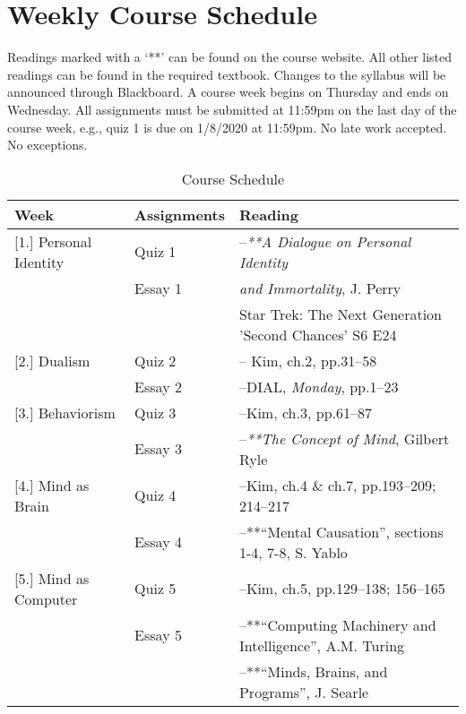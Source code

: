 \documentclass[article,oneside]{memoir}
\begin{document}
\section{Weekly Course Schedule}
Readings marked with a `**' can be found on the course website. All other listed readings can be found in the required textbook. Changes to the syllabus will be announced through Blackboard. A course week begins on Thursday and ends on Wednesday.   All assignments must be submitted at 11:59pm on the last day of the course week, e.g., quiz 1 is due on 1/8/2020 at 11:59pm. No late work accepted. No exceptions.   \newline


\begin{center}
\begin{longtable}{p{4.5cm}p{2cm}p{6cm}}
 
  \caption{Course Schedule} \\
  \toprule
  \textbf{Week} &\textbf{Assignments} & \textbf{Reading} \\
  \midrule

[1.] Personal Identity			& Quiz 1		& --\emph{**A Dialogue on Personal Identity } \\
				        		& Essay 1		& \emph{and Immortality}, J. Perry  \\ 
						&			& Star Trek: The Next Generation 'Second Chances' S6 E24 \\ [1.8\baselineskip]
	
[2.] Dualism			      	& Quiz 2		& -- Kim, ch.2, pp.31--58\\
					        	& Essay 2		& --DIAL, \emph{Monday}, pp.1--23  \\ [1.8\baselineskip]


[3.] Behaviorism		    	& Quiz 3	   	& --Kim, ch.3, pp.61--87 \\
			        			& Essay 3		&  --\emph{**The Concept of Mind}, Gilbert Ryle\\ [1.8\baselineskip]
  
[4.] Mind as Brain 		   	& Quiz 4	   	& --Kim, ch.4 \& ch.7, pp.193--209; 214--217\\
					         & Essay 4		& --**``Mental Causation'', sections 1-4, 7-8, S. Yablo  \\  [1.8\baselineskip]

[5.] Mind as Computer		& Quiz 5		& --Kim, ch.5, pp.129--138; 156--165\\
		            			& Essay 5		& --**``Computing Machinery and Intelligence'', A.M. Turing  \\  
						&			& --**``Minds, Brains, and Programs'', J.  Searle \\ [1.8\baselineskip]
		

\end{longtable}
\end{center}
\end{document}
